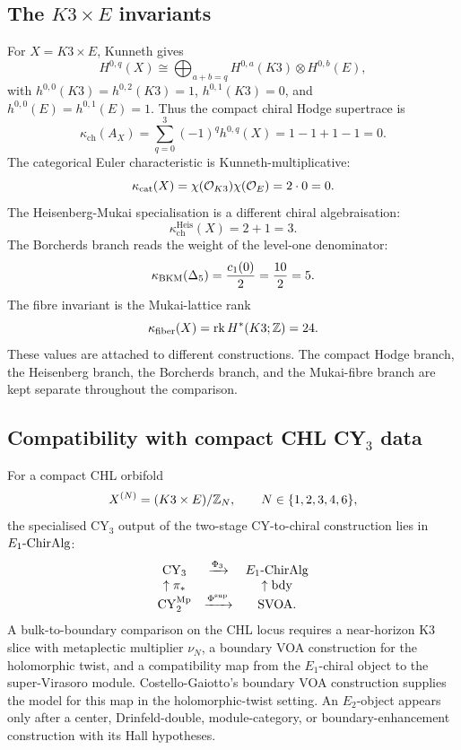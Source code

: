 \subsection*{The \(K3\times E\) invariants}

For \(X=K3\times E\), Kunneth gives
\[
  H^{0,q}(X)
  \cong
  \bigoplus_{a+b=q}H^{0,a}(K3)\otimes H^{0,b}(E),
\]
with \(h^{0,0}(K3)=h^{0,2}(K3)=1\), \(h^{0,1}(K3)=0\), and
\(h^{0,0}(E)=h^{0,1}(E)=1\). Thus the compact chiral Hodge supertrace is
\[
  \kappa_{\mathrm{ch}}(A_X)
  =
  \sum_{q=0}^{3}(-1)^q h^{0,q}(X)
  =
  1-1+1-1
  =
  0.
\]
The categorical Euler characteristic is Kunneth-multiplicative:
\[
  \kappa_{\mathrm{cat}}(X)
  =
  \chi(\mathcal{O}_{K3})\chi(\mathcal{O}_E)
  =
  2\cdot0
  =
  0.
\]
The Heisenberg-Mukai specialisation is a different chiral
algebraisation:
\[
  \kappa_{\mathrm{ch}}^{\mathrm{Heis}}(X)=2+1=3.
\]
The Borcherds branch reads the weight of the level-one denominator:
\[
  \kappa_{\mathrm{BKM}}(\Delta_5)=\frac{c_1(0)}2=\frac{10}{2}=5.
\]
The fibre invariant is the Mukai-lattice rank
\[
  \kappa_{\mathrm{fiber}}(X)=\operatorname{rk}H^*(K3;\mathbb{Z})=24.
\]
These values are attached to different constructions. The compact
Hodge branch, the Heisenberg branch, the Borcherds branch, and the
Mukai-fibre branch are kept separate throughout the comparison.

\subsection*{Compatibility with compact CHL CY\(_3\) data}

For a compact CHL orbifold
\[
  X^{(N)}=(K3\times E)/\mathbb{Z}_N,\qquad N\in\{1,2,3,4,6\},
\]
the specialised CY\(_3\) output of the two-stage CY-to-chiral
construction lies in \(E_1\text{-}\mathrm{ChirAlg}\):
\[
\begin{array}{ccc}
  \mathrm{CY}_3 & \xrightarrow{\Phi_3} & E_1\text{-}\mathrm{ChirAlg} \\
  \uparrow\pi_* & & \uparrow\mathrm{bdy} \\
  \mathrm{CY}_2^{\mathrm{Mp}} & \xrightarrow{\Phi^{\mathrm{sup}}} & \mathrm{SVOA} .
\end{array}
\]
A bulk-to-boundary comparison on the CHL locus requires a near-horizon
K3 slice with metaplectic multiplier \(\nu_N\), a boundary VOA
construction for the holomorphic twist, and a compatibility map from
the \(E_1\)-chiral object to the super-Virasoro module. Costello-Gaiotto's
boundary VOA construction supplies the model for this map in
the holomorphic-twist setting. An \(E_2\)-object appears only after a
center, Drinfeld-double, module-category, or boundary-enhancement
construction with its Hall hypotheses.


